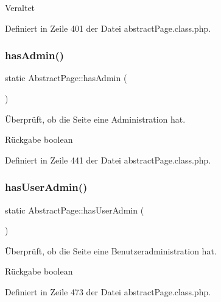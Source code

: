 \begin{DoxyRefDesc}{Veraltet}
\item[\mbox{\hyperlink{deprecated__deprecated000037}{Veraltet}}]\end{DoxyRefDesc}


Definiert in Zeile 401 der Datei abstract\+Page.\+class.\+php.

\mbox{\label{class_abstract_page_ac94f5dcaf85fcfea743f3f656b30f102}} 
\subsubsection{\texorpdfstring{has\+Admin()}{hasAdmin()}}
{\footnotesize\ttfamily static Abstract\+Page\+::has\+Admin (\begin{DoxyParamCaption}{ }\end{DoxyParamCaption})\hspace{0.3cm}{\ttfamily [static]}}

Überprüft, ob die Seite eine Administration hat. \begin{DoxyReturn}{Rückgabe}
boolean 
\end{DoxyReturn}


Definiert in Zeile 441 der Datei abstract\+Page.\+class.\+php.

\mbox{\label{class_abstract_page_a1e1df9687e56910c54512386d50a88ce}} 
\subsubsection{\texorpdfstring{has\+User\+Admin()}{hasUserAdmin()}}
{\footnotesize\ttfamily static Abstract\+Page\+::has\+User\+Admin (\begin{DoxyParamCaption}{ }\end{DoxyParamCaption})\hspace{0.3cm}{\ttfamily [static]}}

Überprüft, ob die Seite eine Benutzeradministration hat. \begin{DoxyReturn}{Rückgabe}
boolean 
\end{DoxyReturn}


Definiert in Zeile 473 der Datei abstract\+Page.\+class.\+php.

